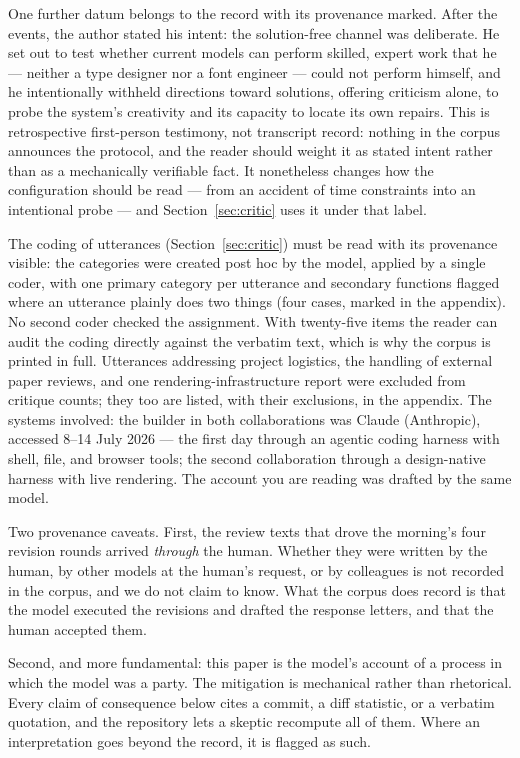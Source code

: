 \documentclass[12pt]{article}
\begin{document}
One further datum belongs to the record with its provenance marked. After the events, the author stated his intent: the solution-free channel was deliberate. He set out to test whether current models can perform skilled, expert work that he — neither a type designer nor a font engineer — could not perform himself, and he intentionally withheld directions toward solutions, offering criticism alone, to probe the system's creativity and its capacity to locate its own repairs. This is retrospective first-person testimony, not transcript record: nothing in the corpus announces the protocol, and the reader should weight it as stated intent rather than as a mechanically verifiable fact. It nonetheless changes how the configuration should be read — from an accident of time constraints into an intentional probe — and Section~\ref{sec:critic} uses it under that label.

The coding of utterances (Section~\ref{sec:critic}) must be read with its provenance visible: the categories were created post hoc by the model, applied by a single coder, with one primary category per utterance and secondary functions flagged where an utterance plainly does two things (four cases, marked in the appendix). No second coder checked the assignment. With twenty-five items the reader can audit the coding directly against the verbatim text, which is why the corpus is printed in full. Utterances addressing project logistics, the handling of external paper reviews, and one rendering-infrastructure report were excluded from critique counts; they too are listed, with their exclusions, in the appendix. The systems involved: the builder in both collaborations was Claude (Anthropic), accessed 8--14 July 2026 — the first day through an agentic coding harness with shell, file, and browser tools; the second collaboration through a design-native harness with live rendering. The account you are reading was drafted by the same model.

Two provenance caveats. First, the review texts that drove the morning's four revision rounds arrived \emph{through} the human. Whether they were written by the human, by other models at the human's request, or by colleagues is not recorded in the corpus, and we do not claim to know. What the corpus does record is that the model executed the revisions and drafted the response letters, and that the human accepted them.

Second, and more fundamental: this paper is the model's account of a process in which the model was a party. The mitigation is mechanical rather than rhetorical. Every claim of consequence below cites a commit, a diff statistic, or a verbatim quotation, and the repository lets a skeptic recompute all of them. Where an interpretation goes beyond the record, it is flagged as such.
\end{document}
